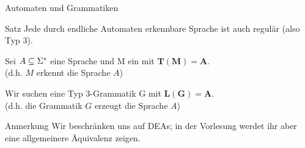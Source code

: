 %
%
%
%

\begin{frame}{Automaten und Grammatiken}
  \begin{exampleblock}{Satz}
    Jede durch  endliche Automaten erkennbare Sprache ist auch regulär (also Typ 3).
  \end{exampleblock}
  Sei \alert<2|handout:0>{$A \subseteq \Sigma^{*}$} eine Sprache und \alert<2|handout:0>{M ein } mit \alert<2-3|handout:0>{$\mathbf{T(M) = A}$}.\\
  (d.h. $M$ erkennt die Sprache $A$) \\
  \vspace{.3cm} %

  Wir suchen eine \alert<4|handout:0>{Typ 3-Grammatik G} mit \alert<4-5|handout:0>{$\mathbf{L(G) = A}$}.\\
  (d.h. die Grammatik $G$ erzeugt die Sprache $A$)
  \vspace{.3cm} %

  \begin{alertblock}{Anmerkung}
    Wir beschränken uns auf DEAs; in der Vorlesung werdet ihr aber eine allgemeinere Äquivalenz zeigen.
  \end{alertblock}
\end{frame}

